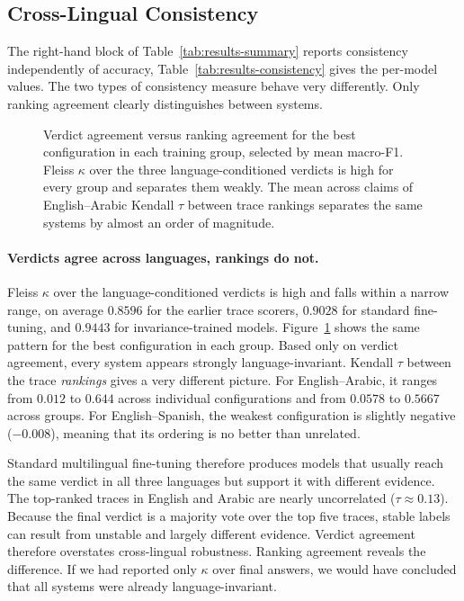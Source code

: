\subsection{Cross-Lingual Consistency}
\label{subsec:res-consistency}

The right-hand block of Table~\ref{tab:results-summary} reports consistency independently of accuracy,
Table~\ref{tab:results-consistency} gives the per-model values. The two types of consistency measure
behave very differently. Only ranking agreement clearly distinguishes between systems.


\begin{figure}[htbp]
  \centering
  
  \caption{Verdict agreement versus ranking agreement for the best configuration in each training
  group, selected by mean macro-F1. Fleiss $\kappa$ over the three language-conditioned verdicts is
  high for every group and separates them weakly. The mean across claims of English--Arabic
  Kendall $\tau$ between trace rankings separates the same systems by almost an order of magnitude.}
  \label{fig:results-agreement}
\end{figure}

\paragraph{Verdicts agree across languages, rankings do not.}
Fleiss $\kappa$ over the language-conditioned verdicts is high and falls within a narrow range, on
average $0.8596$ for the earlier trace scorers, $0.9028$ for standard fine-tuning, and $0.9443$ for
invariance-trained models. Figure~\ref{fig:results-agreement} shows the same pattern for the best
configuration in each group. Based only on verdict agreement, every system
appears strongly language-invariant. Kendall $\tau$ between the trace \emph{rankings} gives a very
different picture. For English--Arabic, it ranges from $0.012$ to $0.644$ across individual
configurations and from $0.0578$ to $0.5667$ across groups. For English--Spanish, the weakest
configuration is slightly negative ($-0.008$), meaning that its ordering is no better than unrelated.

Standard multilingual fine-tuning therefore produces models that usually reach the same verdict in
all three languages but support it with different evidence. The top-ranked traces in English and
Arabic are nearly uncorrelated ($\tau \approx 0.13$). Because the final verdict is a majority vote
over the top five traces, stable labels can result from unstable and largely different evidence.
Verdict agreement therefore overstates cross-lingual robustness. Ranking agreement reveals the
difference. If we had reported only $\kappa$ over final answers, we would have concluded that all
systems were already language-invariant.


